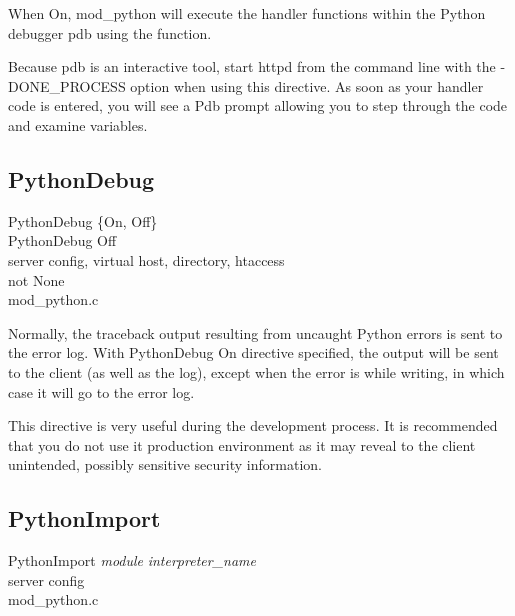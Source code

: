 When On, mod_python will execute the handler functions within the
Python debugger pdb using the  function.

Because pdb is an interactive tool, start httpd from the command line
with the -DONE_PROCESS option when using this directive. As soon as
your handler code is entered, you will see a Pdb prompt allowing you
to step through the code and examine variables.

\subsection{PythonDebug\label{dir-other-pd}}

PythonDebug \{On, Off\} \\
PythonDebug Off\\
server config, virtual host, directory, htaccess\\
not None\\
mod_python.c

Normally, the traceback output resulting from uncaught Python errors
is sent to the error log. With PythonDebug On directive specified, the
output will be sent to the client (as well as the log), except when
the error is  while writing, in which case it will go
to the error log.

This directive is very useful during the development process. It is
recommended that you do not use it production environment as it may
reveal to the client unintended, possibly sensitive security
information.

\subsection{PythonImport\label{dir-other-pimp}}

PythonImport \emph{module} \emph{interpreter_name}\\
server config\\
mod_python.c

